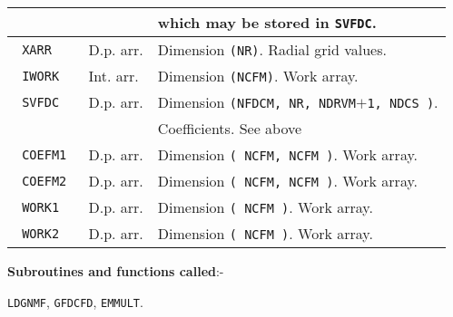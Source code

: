 \begin{tabular}{|l|l|l|}
& & which may be stored in \verb+SVFDC+. \\
\hline
\verb+ XARR + & D.p. arr. & Dimension \verb+(NR)+. Radial grid values. \\
\hline
\verb+ IWORK + & Int. arr. & Dimension \verb+(NCFM)+. Work array. \\
\hline
\verb+ SVFDC + & D.p. arr. & Dimension
\verb+(NFDCM, NR, NDRVM+$+$\verb+1, NDCS )+. \\
& & Coefficients. See above \\
\hline
\verb+ COEFM1 + & D.p. arr. & Dimension \verb+( NCFM, NCFM )+. Work array. \\
\hline
\verb+ COEFM2 + & D.p. arr. & Dimension \verb+( NCFM, NCFM )+. Work array. \\
\hline
\verb+ WORK1 + & D.p. arr. & Dimension \verb+( NCFM )+. Work array. \\
\hline
\verb+ WORK2 + & D.p. arr. & Dimension \verb+( NCFM )+. Work array. \\
\hline
\end{tabular} \newline

{\bf Subroutines and functions called}:- \newline

\verb+LDGNMF+, \verb+GFDCFD+, \verb+EMMULT+.
